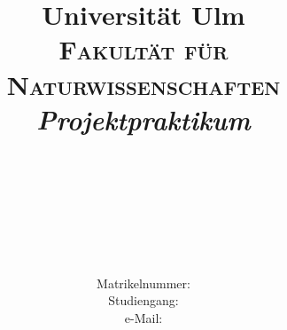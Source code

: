 \title{Universit\"{a}t Ulm\\\vspace{1cm}
{\LARGE \textnormal{\textsc{Fakult\"{a}t f\"{u}r Naturwissenschaften}}}\\\vspace{2cm} {\LARGE \textnormal{\textsl{Projektpraktikum \Semester}}}\\\vspace{2cm} {\LARGE\zubearbeiten{\textit{\Projekt}}}\\
{\Large \zubearbeiten{\textit{\Schwerpunkt}}}\\\vspace{0.5cm} \zubearbeiten{\textit{\dieEinlage}}}

\author{{\LARGE \zubearbeiten{\IhrName}}\\ $_{}$\\$_{}$\\\vspace*{1.cm}
Matrikelnummer:  \zubearbeiten{\Matrikelnummer}\\\vspace{0.8cm} Studiengang: \zubearbeiten{\Studiengang}\\\vspace{0.4cm} e-Mail: \zubearbeiten{\emailAdresse}}

\date{\zubearbeiten{\dasDatum}}

\maketitle
